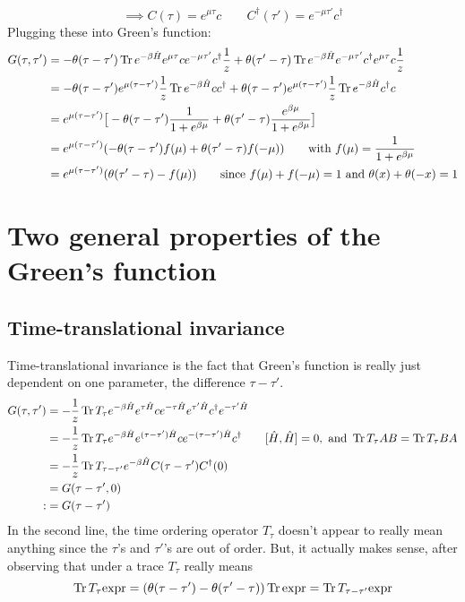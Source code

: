 \documentclass{article}
\begin{document}
\begin{equation*} \implies C(\tau) = e^{\mu \tau} c \qquad C^\dagger(\tau') = e^{-\mu\tau'} c^\dagger \end{equation*}
Plugging these into Green's function:
\begin{align*}
G(\tau, \tau') &= -\theta(\tau - \tau') \operatorname{Tr} e^{-\beta\hat{H}} e^{\mu \tau} c e^{-\mu\tau'} c^\dagger \frac{1}{z} + \theta(\tau'-\tau)\operatorname{Tr} e^{-\beta\hat{H}} e^{-\mu\tau'}c^\dagger e^{\mu\tau}c\frac{1}{z} \\
&= -\theta(\tau-\tau')e^{\mu(\tau-\tau')}\frac{1}{z} \operatorname{Tr} e^{-\beta\hat{H}} cc^\dagger + \theta(\tau-\tau')e^{\mu(\tau-\tau')}\frac{1}{z} \operatorname{Tr} e^{-\beta\hat{H}} c^\dagger c  \\
&= e^{\mu(\tau-\tau')} \big[ -\theta(\tau-\tau') \frac{1}{1 + e^{\beta \mu}} + \theta(\tau'-\tau) \frac{e^{\beta\mu}}{1 + e^{\beta\mu}} \big] \\
&= e^{\mu(\tau-\tau')}(-\theta(\tau-\tau')f(\mu) + \theta(\tau'-\tau)f(-\mu)) \qquad \text{with } f(\mu) = \frac{1}{1 + e^{\beta\mu}} \\
&= e^{\mu(\tau-\tau')}(\theta(\tau'-\tau) - f(\mu)) \qquad \text{since } f(\mu) + f(-\mu) = 1 \text{ and } \theta(x) + \theta(-x) = 1
\end{align*}
\section{Two general properties of the Green's function}
\subsection{Time-translational invariance}
Time-translational invariance is the fact that Green's function is really just dependent on one parameter, the difference $\tau-\tau'$. 
\begin{align*}
G(\tau,\tau') &= -\frac{1}{z} \operatorname{Tr} T_\tau e^{-\beta\hat{H}} e^{\tau\hat{H}} c e^{-\tau\hat{H}} e^{\tau'\hat{H}} c^\dagger e^{-\tau'\hat{H}} \\
&= -\frac{1}{z} \operatorname{Tr} T_\tau e^{-\beta\hat{H}} e^{(\tau -\tau')\hat{H}} c e^{-(\tau-\tau')\hat{H}} c^\dagger \qquad [\hat{H}, \hat{H}] = 0, \text{ and } \operatorname{Tr} T_\tau AB = \operatorname{Tr} T_\tau BA \\
&= -\frac{1}{z} \operatorname{Tr} T_{\tau-\tau'} e^{-\beta\hat{H}} C(\tau-\tau') C^\dagger(0) \\
&= G(\tau-\tau', 0) \\
:&= G(\tau-\tau')
\end{align*}
In the second line, the time ordering operator $T_\tau$ doesn't appear to really mean anything since the $\tau$'s and $\tau'$'s are out of order. But, it actually makes sense, after observing that under a trace $T_\tau$ really means 
\begin{equation*} \operatorname{Tr} T_\tau \text{expr} = (\theta(\tau-\tau') - \theta(\tau'-\tau)) \operatorname{Tr} \text{expr} = \operatorname{Tr} T_{\tau-\tau'} \text{expr} \end{equation*}
\end{document}
